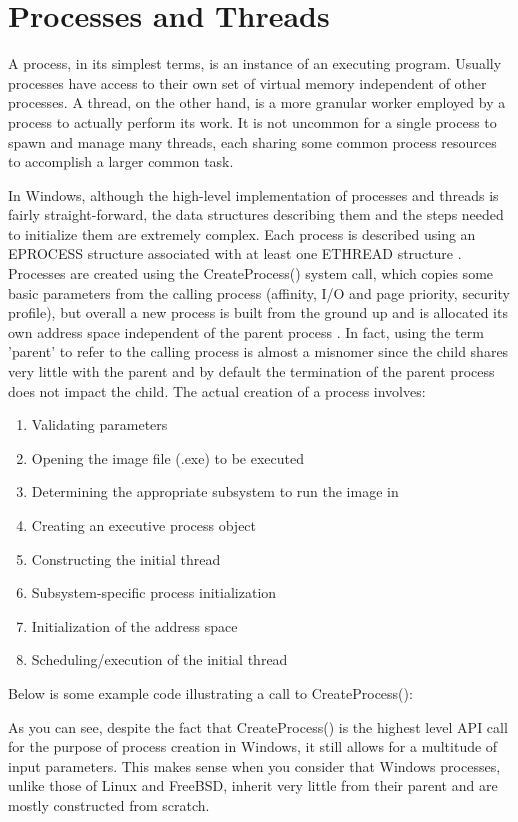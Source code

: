 \documentclass[onecolumn, draftclsnofoot,10pt, compsoc]{IEEEtran}
\begin{document}
\section{Processes and Threads}
A process, in its simplest terms, is an instance of an executing program. Usually processes have access to their own set of virtual memory independent of other processes. A thread, on the other hand, is a more granular worker employed by a process to actually perform its work. It is not uncommon for a single process to spawn and manage many threads, each sharing some common process resources to accomplish a larger common task.

In Windows, although the high-level implementation of processes and threads is fairly straight-forward, the data structures describing them and the steps needed to initialize them are extremely complex. Each process is described using an EPROCESS structure associated with at least one ETHREAD structure \cite{WindowsInternals}. Processes are created using the CreateProcess() system call, which copies some basic parameters from the calling process (affinity, I/O and page priority, security profile), but overall a new process is built from the ground up and is allocated its own address space independent of the parent process \cite{WindowsInternals}. In fact, using the term 'parent' to refer to the calling process is almost a misnomer since the child shares very little with the parent and by default the termination of the parent process does not impact the child. The actual creation of a process involves:
\begin{enumerate}
\item Validating parameters 
\item Opening the image file (.exe) to be executed
\item Determining the appropriate subsystem to run the image in 
\item Creating an executive process object
\item Constructing the initial thread
\item Subsystem-specific process initialization
\item Initialization of the address space
\item Scheduling/execution of the initial thread
\end{enumerate}

Below is some example code illustrating a call to CreateProcess():

As you can see, despite the fact that CreateProcess() is the highest level API call for the purpose of process creation in Windows, it still allows for a multitude of input parameters. This makes sense when you consider that Windows processes, unlike those of Linux and FreeBSD, inherit very little from their parent and are mostly constructed from scratch.
\end{document}
